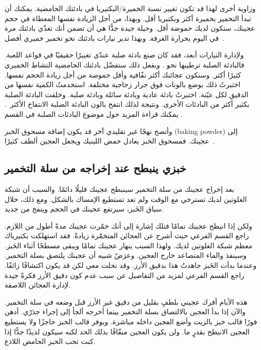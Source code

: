 وزاوية أخرى لهذا قد تكون تغيير نسبة الخميرة/البكتيريا في بادئتك الحامضية. يمكنك أن تبدأ التخمير بخميرة أكثر وبكتيريا أقل. وبهذا، من أجل الزيادة نفسها المعطاة في حجم عجينك، ستكون لديك حموضة أقل. وحيلة جيدة جدًّا هي أن تضمن أنك تغذّي بادئتك مرة في اليوم بحرارة الغرفة. وبهذا تدير تيارات بادئتك نحو تخمير خميري أفضل~\cite*{more+active+starter}.

ولإدارة التيارات أبعد، فقد كان صنع بادئة صلبة عندّي تغييرًا حقيقيًا في قواعد اللعبة. فالبادئة الصلبة ترطيبها نحو . وبفعل ذلك ستفضّل بادئتك الحامضية النشاط الخميري كثيرًا أكثر. وستكون عجائنك أكثر نفّافية وأقل حموضة من أجل زيادة الحجم نفسها. اختبرتُ ذلك بوضع بالونات فوق جرار زجاجية مختلفة. استخدمتُ الكمية نفسها من الدقيق لكل عيّنة. اختبرتُ بادئة عادية وبادئة سائلة وبادئة صلبة. وخلقت البادئة الصلبة  بكثير أكثر من البادئات الأخرى. ونتيجة لذلك انتفخ بالون البادئة الصلبة الانتفاخ الأكثر~\cite{stiff+starter}. يمكنك قراءة المزيد حول موضوع البادئات الصلبة في القسم .

وأنصح نهجًا غير تقليدي آخر قد يكون إضافة مسحوق الخبز \textenglish{(baking powder)} إلى عجينك. فمسحوق الخبز يعادل حمض اللبنيك ويجعل العجين ألطف كثيرًا~\cite{baking+powder+reduce-acidity}.

\subsection{خبزي ينبطح عند إخراجه من سلة التخمير}

بعد إخراج عجينك من سلة التخمير سينبطح عجينك قليلًا دائمًا. والسبب أن شبكة الغلوتين لديك تسترخي مع الوقت ولم تعد تستطيع الإمساك بالشكل. ومع ذلك، خلال سياق الخَبز، سيرتفع عجينك في الحجم وينفخ من جديد.

ولكن إذا انبطح عجينك تمامًا فتلك إشارة إلى أنك خمّرت عجينك مدةً أطول من اللازم. راجع القسم الفرعي  حيث أشرح عن العجائن المتخمّرة زيادةً. فقد استهلكت بكتيرياك معظم شبكة الغلوتين لديك. ولهذا السبب ينهار عجينك تمامًا ويبقى مسطحًا أثناء الخَبز. وسينفذ  والماء المتصاعد خارج العجين. وعرَضٌ شبيه أن عجينك يلتصق بسلة التخمير. وعندما بدأت الخَبز جاهدتُ هذا بدقيق الأرز. وقد نحلت معي لكن قد يكون اكتشافًا زائفًا. راجع القسم الفرعي  لمزيد من التفاصيل عن سبب عدم كون دقيق الأرز فكرةً جيدة لإدارة العجائن اللاصقة.

هذه الأيام أفرك عجيني بلطفٍ بقليل من دقيق غير الأرز قبل وضعه في سلة التخمير. والآن إذا بدأ العجين بالالتصاق بسلة التخمير بينما أخرجه ألجأ إلى إجراء جذرّي. أدهن فورًا قالب خبز بالزيت وأضع العجين داخله مباشرة. ويوفر قالب الخبز حاجزًا ولا يستطيع العجين الانبطح بقدرٍ ما. ولن يكون العجين منفّافًا بذلك الحد لكنه سيكون لذيذًا جدًّا إذا كنت تحب الخبز الحامض اللاذع.

